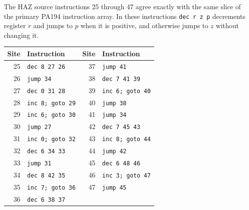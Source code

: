 \documentclass[11pt]{article}
\begin{document}
The HAZ source instructions 25 through 47 agree exactly with the same
slice of the primary PA194 instruction array. In these instructions
\texttt{dec r z p} decrements register $r$ and jumps to $p$ when it is
positive, and otherwise jumps to $z$ without changing it.

\begin{center}\small
\begin{tabular}{r l @{\qquad} r l}
\toprule
Site&Instruction&Site&Instruction\\
\midrule
25&\texttt{dec 8 27 26}&37&\texttt{jump 41}\\
26&\texttt{jump 34}&38&\texttt{dec 7 41 39}\\
27&\texttt{dec 0 31 28}&39&\texttt{inc 6; goto 40}\\
28&\texttt{inc 8; goto 29}&40&\texttt{jump 38}\\
29&\texttt{inc 6; goto 30}&41&\texttt{jump 34}\\
30&\texttt{jump 27}&42&\texttt{dec 7 45 43}\\
31&\texttt{inc 0; goto 32}&43&\texttt{inc 8; goto 44}\\
32&\texttt{dec 6 34 33}&44&\texttt{jump 42}\\
33&\texttt{jump 31}&45&\texttt{dec 6 48 46}\\
34&\texttt{dec 8 42 35}&46&\texttt{inc 3; goto 47}\\
35&\texttt{inc 7; goto 36}&47&\texttt{jump 45}\\
36&\texttt{dec 6 38 37}&&\\
\bottomrule
\end{tabular}
\end{center}
\end{document}
